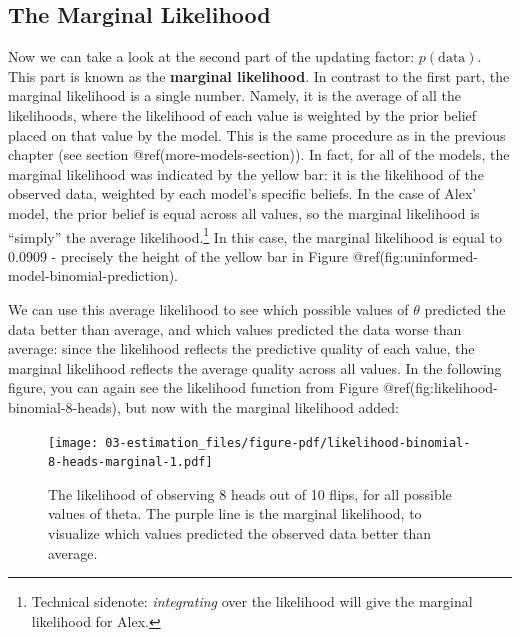 \documentclass[
  letterpaper,
  DIV=11,
  numbers=noendperiod]{scrreprt}
\begin{document}
\hypertarget{the-marginal-likelihood}{%
\subsection{The Marginal Likelihood}\label{the-marginal-likelihood}}

Now we can take a look at the second part of the updating factor:
\(p( \text{data})\). This part is known as the \textbf{marginal
likelihood}. In contrast to the first part, the marginal likelihood is a
single number. Namely, it is the average of all the likelihoods, where
the likelihood of each value is weighted by the prior belief placed on
that value by the model. This is the same procedure as in the previous
chapter (see section @ref(more-models-section)). In fact, for all of the
models, the marginal likelihood was indicated by the yellow bar: it is
the likelihood of the observed data, weighted by each model's specific
beliefs. In the case of Alex' model, the prior belief is equal across
all values, so the marginal likelihood is ``simply'' the average
likelihood.\footnote{Technical sidenote: \emph{integrating} over the
  likelihood will give the marginal likelihood for Alex.} In this case,
the marginal likelihood is equal to 0.0909 - precisely the height of the
yellow bar in Figure @ref(fig:uninformed-model-binomial-prediction).

We can use this average likelihood to see which possible values of
\(\theta\) predicted the data better than average, and which values
predicted the data worse than average: since the likelihood reflects the
predictive quality of each value, the marginal likelihood reflects the
average quality across all values. In the following figure, you can
again see the likelihood function from Figure
@ref(fig:likelihood-binomial-8-heads), but now with the marginal
likelihood added:

\begin{figure}

{\centering \texttt{[image: 03-estimation\_files/figure-pdf/likelihood-binomial-8-heads-marginal-1.pdf]}

}

\caption{The likelihood of observing 8 heads out of 10 flips, for all
possible values of theta. The purple line is the marginal likelihood, to
visualize which values predicted the observed data better than average.}

\end{figure}
\end{document}
